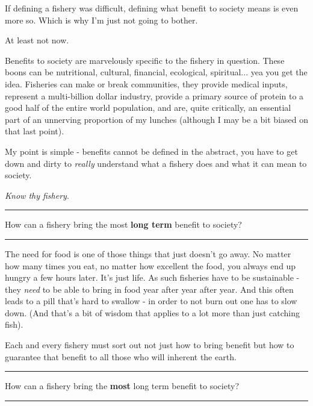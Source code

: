 \documentclass[11pt,a5paper]{book}
\begin{document}
If defining a fishery was difficult, defining what benefit to society means is even more so. Which is why I'm just not going to bother.
\newline

At least not now.
\newline

Benefits to society are marvelously specific to the fishery in question. These boons can be nutritional, cultural, financial, ecological, spiritual... yea you get the idea. Fisheries can make or break communities, they provide medical inputs, represent a multi-billion dollar industry, provide a primary source of protein to a good half of the entire world population, and are, quite critically, an essential part of an unnerving proportion of my lunches (although I may be a bit biased on that last point).
\newline

My point is simple - benefits cannot be defined in the abstract, you have to get down and dirty to \textit{really} understand what a fishery does and what it can mean to society. 
\newline

\textit{Know thy fishery}.
\newpage


\noindent \rule{\textwidth}{0.5pt} 
\noindent How can a fishery bring the most \textbf{long term} benefit to society?
\newline
\rule{\textwidth}{0.5pt} 
\vspace{5pt}

The need for food is one of those things that just doesn't go away. No matter how many times you eat, no matter how excellent the food, you always end up hungry a few hours later. It's just life. As such fisheries have to be sustainable - they \textit{need} to be able to bring in food year after year after year. And this often leads to a pill that's hard to swallow - in order to not burn out one has to slow down. (And that's a bit of wisdom that applies to a lot more than just catching fish). \newline

Each and every fishery must sort out not just how to bring benefit but how to guarantee that benefit to all those who will inherent the earth.
\newpage


\noindent \rule{\textwidth}{0.5pt} 
\noindent How can a fishery bring the \textbf{most} long term benefit to society?
\newline
\rule{\textwidth}{0.5pt} 
\vspace{5pt}
\end{document}

